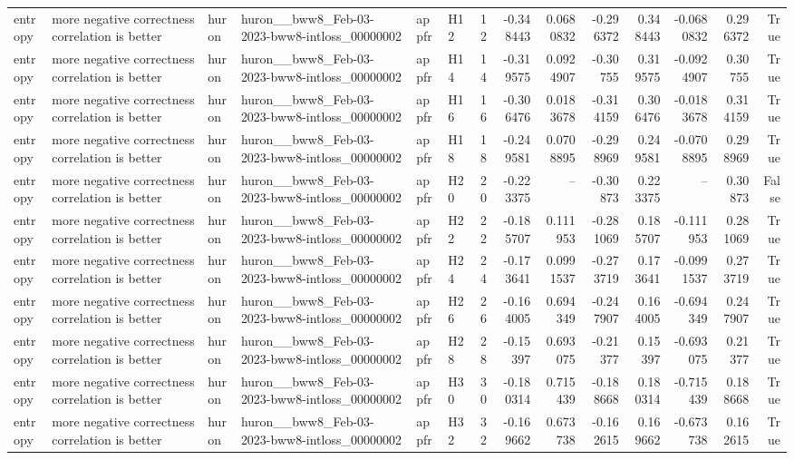 \begin{longtable}{llllllrrrrrrrr}
entropy & more negative correctness correlation is better & huron & huron\_\_bww8\_Feb-03-2023-bww8-intloss\_00000002 & appfr & H12 & 12 & -0.348443 & 0.0680832 & -0.296372 & 0.348443 & -0.0680832 & 0.296372 & True \\
entropy & more negative correctness correlation is better & huron & huron\_\_bww8\_Feb-03-2023-bww8-intloss\_00000002 & appfr & H14 & 14 & -0.319575 & 0.0924907 & -0.30755 & 0.319575 & -0.0924907 & 0.30755 & True \\
entropy & more negative correctness correlation is better & huron & huron\_\_bww8\_Feb-03-2023-bww8-intloss\_00000002 & appfr & H16 & 16 & -0.306476 & 0.0183678 & -0.314159 & 0.306476 & -0.0183678 & 0.314159 & True \\
entropy & more negative correctness correlation is better & huron & huron\_\_bww8\_Feb-03-2023-bww8-intloss\_00000002 & appfr & H18 & 18 & -0.249581 & 0.0708895 & -0.298969 & 0.249581 & -0.0708895 & 0.298969 & True \\
entropy & more negative correctness correlation is better & huron & huron\_\_bww8\_Feb-03-2023-bww8-intloss\_00000002 & appfr & H20 & 20 & -0.223375 & -- & -0.30873 & 0.223375 & -- & 0.30873 & False \\
entropy & more negative correctness correlation is better & huron & huron\_\_bww8\_Feb-03-2023-bww8-intloss\_00000002 & appfr & H22 & 22 & -0.185707 & 0.111953 & -0.281069 & 0.185707 & -0.111953 & 0.281069 & True \\
entropy & more negative correctness correlation is better & huron & huron\_\_bww8\_Feb-03-2023-bww8-intloss\_00000002 & appfr & H24 & 24 & -0.173641 & 0.0991537 & -0.273719 & 0.173641 & -0.0991537 & 0.273719 & True \\
entropy & more negative correctness correlation is better & huron & huron\_\_bww8\_Feb-03-2023-bww8-intloss\_00000002 & appfr & H26 & 26 & -0.164005 & 0.694349 & -0.247907 & 0.164005 & -0.694349 & 0.247907 & True \\
entropy & more negative correctness correlation is better & huron & huron\_\_bww8\_Feb-03-2023-bww8-intloss\_00000002 & appfr & H28 & 28 & -0.15397 & 0.693075 & -0.21377 & 0.15397 & -0.693075 & 0.21377 & True \\
entropy & more negative correctness correlation is better & huron & huron\_\_bww8\_Feb-03-2023-bww8-intloss\_00000002 & appfr & H30 & 30 & -0.180314 & 0.715439 & -0.188668 & 0.180314 & -0.715439 & 0.188668 & True \\
entropy & more negative correctness correlation is better & huron & huron\_\_bww8\_Feb-03-2023-bww8-intloss\_00000002 & appfr & H32 & 32 & -0.169662 & 0.673738 & -0.162615 & 0.169662 & -0.673738 & 0.162615 & True \\

\end{longtable}
